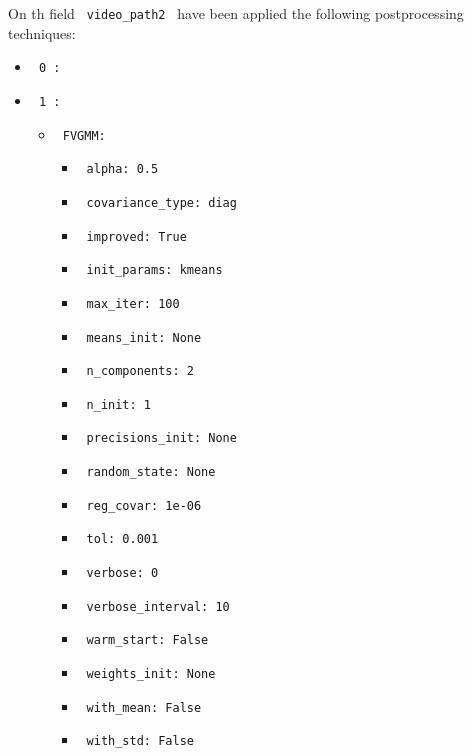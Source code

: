 \documentclass[11pt]{article}
\begin{document}
On th field \verb| video_path2 | have been applied the following postprocessing techniques:
\begin{itemize}
    \item
     \verb| 0 :|
     \begin{itemize}
           \end{itemize}
    \item
     \verb| 1 :|
     \begin{itemize}
             \item
            \verb| FVGMM: |

                   \begin{itemize}
                                    \item
                        \verb| alpha: 0.5 |
                                    \item
                        \verb| covariance_type: diag |
                                    \item
                        \verb| improved: True |
                                    \item
                        \verb| init_params: kmeans |
                                    \item
                        \verb| max_iter: 100 |
                                    \item
                        \verb| means_init: None |
                                    \item
                        \verb| n_components: 2 |
                                    \item
                        \verb| n_init: 1 |
                                    \item
                        \verb| precisions_init: None |
                                    \item
                        \verb| random_state: None |
                                    \item
                        \verb| reg_covar: 1e-06 |
                                    \item
                        \verb| tol: 0.001 |
                                    \item
                        \verb| verbose: 0 |
                                    \item
                        \verb| verbose_interval: 10 |
                                    \item
                        \verb| warm_start: False |
                                    \item
                        \verb| weights_init: None |
                                    \item
                        \verb| with_mean: False |
                                    \item
                        \verb| with_std: False |
                            \end{itemize}
       

\end{itemize}
\end{itemize}
\end{document}
